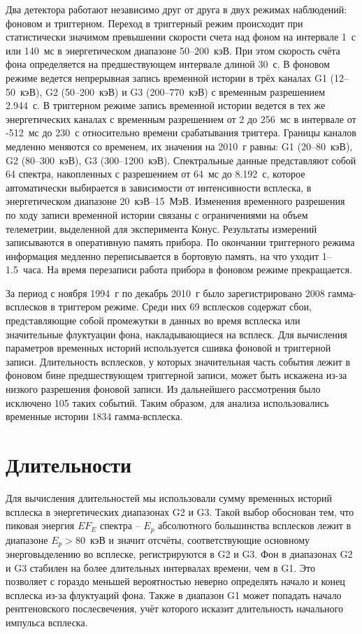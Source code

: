 Два детектора работают независимо друг от друга в двух режимах наблюдений: фоновом и триггерном. Переход в триггерный режим происходит при статистически значимом превышении скорости счета над фоном на интервале 1~с или 140~мс в энергетическом диапазоне 50--200~кэВ. При этом скорость счёта фона определяется на предшествующем интервале длиной 30~с. В фоновом режиме ведется непрерывная запись временной истории в трёх каналах G1 (12--50~кэВ), G2 (50--200~кэВ) и G3 (200--770~кэВ) с временным разрешением 2.944~с. В триггерном режиме запись временной истории ведется в тех же энергетических каналах с временным разрешением от 2 до 256~мс в интервале от -512~мс до 230~с относительно времени срабатывания триггера. Границы каналов медленно меняются со временем, их значения на 2010~г равны: G1 (20--80~кэВ), G2 (80--300~кэВ), G3 (300--1200~кэВ). Спектральные данные представляют собой 64 спектра, накопленных с разрешением от 64~мс до 8.192~с, которое автоматически выбирается в зависимости от интенсивности всплеска, в энергетическом диапазоне 20~кэВ--15~МэВ. Изменения временного разрешения по ходу записи временной истории связаны с ограничениями на объем телеметрии, выделенной для эксперимента Конус. Результаты измерений записываются в оперативную память прибора. По окончании триггерного режима информация медленно переписывается в бортовую память, на
что уходит 1--1.5~часа. На время перезаписи работа прибора в фоновом режиме прекращается.

За период с ноября 1994~г по декабрь 2010~г было зарегистрировано 2008 гамма-всплесков в триггером режиме. Среди них 69 всплесков содержат сбои, представляющие собой промежутки в данных во время всплеска или значительные флуктуации фона, накладывающиеся на всплеск. Для вычисления параметров временных историй используется сшивка фоновой и триггерной записи. Длительность всплесков, у которых значительная часть события лежит в фоновом бине предшествующем триггерной записи, может быть искажена из-за низкого разрешения фоновой записи. Из дальнейшего рассмотрения было исключено 105 таких событий. Таким образом, для анализа использовались временные истории 1834 гамма-всплеска. 

\section{Длительности}\label{sec:Durations}
Для вычисления длительностей мы использовали сумму временных историй всплеска в энергетических диапазонах G2 и G3. Такой выбор обоснован тем, что  пиковая энергия $E F_{E}$ спектра -- $E_p$ абсолютного большинства всплесков лежит в диапазоне $E_p>80$~кэВ и значит отсчёты, соответствующие  основному энерговыделению во всплеске, регистрируются в G2 и G3. Фон в диапазонах G2 и G3 стабилен на более длительных интервалах времени, чем в G1. Это позволяет с гораздо меньшей вероятностью неверно определять начало и конец всплеска из-за флуктуаций фона. Также в диапазон G1 может попадать начало рентгеновского послесвечения, учёт которого исказит длительность начального импульса всплеска.

